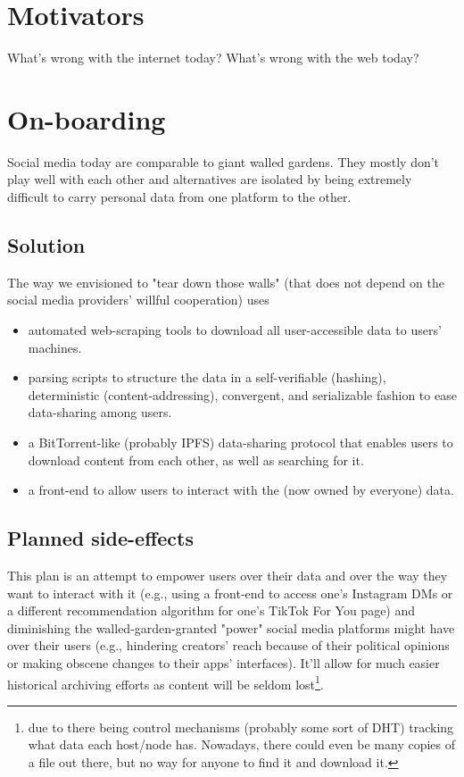 \section{Motivators}

What's wrong with the internet today? What's wrong with the web today?

\section{On-boarding}

Social media today are comparable to giant walled gardens.
They mostly don't play well with each other and alternatives are isolated by being extremely difficult to carry personal data from one platform to the other.

\subsection{Solution} 

The way we envisioned to "tear down those walls" (that does not depend on the social media providers' willful cooperation) uses
\begin{itemize}
  \item automated web-scraping tools to download all user-accessible data to users' machines.
  \item parsing scripts to structure the data in a self-verifiable (hashing), deterministic (content-addressing), convergent, and serializable fashion to ease data-sharing among users.
  \item a BitTorrent-like (probably IPFS) data-sharing protocol that enables users to download content from each other, as well as searching for it.
  \item a front-end to allow users to interact with the (now owned by everyone) data.
\end{itemize}

\subsection{Planned side-effects}

This plan is an attempt to empower users over their data and over the way they want to interact with it (e.g., using a front-end to access one's Instagram DMs or a different recommendation algorithm for one's TikTok For You page) and diminishing the walled-garden-granted "power" social media platforms might have over their users (e.g., hindering creators' reach because of their political opinions or making obscene changes to their apps' interfaces).
It'll allow for much easier historical archiving efforts as content will be seldom lost\footnote{due to there being control mechanisms (probably some sort of DHT) tracking what data each host/node has.
Nowadays, there could even be many copies of a file out there, but no way for anyone to find it and download it.}.
